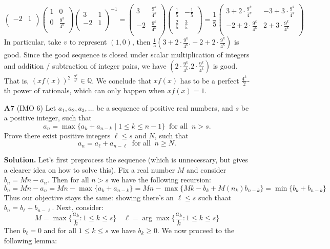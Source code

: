 \documentclass[11pt]{article}
\newcommand{\bbQ}{\mathbb Q}
\newcommand{\<}{\langle}
\renewcommand{\>}{\rangle}
\begin{document}
\begin{enumerate}
\[\begin{pmatrix}
	-2 & 1\\
	\end{pmatrix}
	\begin{pmatrix}
	1 & 0\\
	0 & \frac{9^k}{4^k}\\
	\end{pmatrix}
	\begin{pmatrix}
	3 & 1\\
	-2 & 1\\
	\end{pmatrix}^{-1}
	=
	\begin{pmatrix}
	3 & \frac{9^k}{4^k}\\
	-2 & \frac{9^k}{4^k}\\
	\end{pmatrix}
	\begin{pmatrix}
	\frac{1}{5} & -\frac{1}{5}\\
	\frac{2}{5} & \frac{3}{5}\\
	\end{pmatrix}
	=\frac 15
	\begin{pmatrix}
	3 + 2\cdot \frac{9^k}{4^k} & -3+3\cdot \frac{9^k}{4^k}\\
	-2 +2\cdot \frac{9^k}{4^k} & 2+3\cdot \frac{9^k}{4^k}\\
	\end{pmatrix}
	\]
	In particular, take $v$ to represent $(1, 0)$, then $\frac 15(3+2\cdot \frac{9^k}{4^k}. -2+2\cdot \frac{9^k}{4^k})$ is good. 
	Since the good sequence is closed under scalar multiplication of integers and addition / subtraction of integer pairs, we have 
	$(2\cdot \frac{9^k}{4^k}. 2\cdot \frac{9^k}{4^k})$ is good. 
	That is, $(xf(x))^{2\cdot \frac{9^k}{4^k}}\in\bbQ$. 
	We conclude that $xf(x)$ has to be a perfect $\frac{4^k}{2}$-th power of rationals, which can only happen when $xf(x)=1$. 
	
	\item [\textbf{A7}] (IMO 6) 
	Let $a_1, a_2, a_3, \ldots$ be a sequence of positive real numbers, and $s$ be a positive integer, such that
	\[a_n = \max \{ a_k + a_{n-k} \mid 1 \leq k \leq n-1 \} \ \textrm{ for all } \ n > s.\]
	Prove there exist positive integers $\ell \leq s$ and $N$, such that
	\[a_n = a_{\ell} + a_{n - \ell} \ \textrm{ for all } \ n \geq N.\]
	
	\textbf{Solution.} 
	Let's first preprocess the sequence (which is unnecessary, but gives a clearer idea on how to solve this). 
	Fix a real number $M$ and consider $b_n=Mn-a_n$. Then for all $n>s$ we have the following recursion: 
	\[
	b_n = Mn - a_n = Mn - \max \{a_k + a_{n-k}\}
	= Mn - \max \{Mk  - b_k + M(n_k) b_{n-k}\}
	= \min \{b_k + b_{n-k}\}
	\]
	Thus our objective stays the same: showing there's an $\ell\le s$ such thaat $b_n=b_{\ell}+b_{n-\ell}$. 
	Next, consider: 
	\[
	M = \max \{\frac{a_k}{k}: 1\le k\le s\}
	\quad 
	\ell = \arg\max \{\frac{a_k}{k}: 1\le k\le s\}
	\]
	Then $b_{\ell}=0$ and for all $1\le k\le s$ we have $b_{k}\ge 0$. 
	We now proceed to the following lemma: 
	

\end{enumerate}
\end{document}
